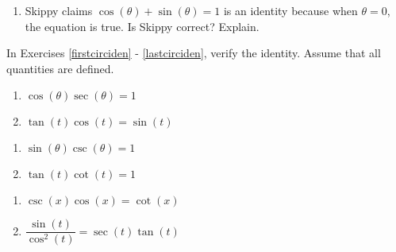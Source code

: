 \begin{enumerate}
\setcounter{enumi}{\value{HW}}

\item Skippy claims  $\cos(\theta) + \sin(\theta) = 1$ is an identity because when $\theta = 0$, the equation is true.  Is Skippy correct? Explain.

\setcounter{HW}{\value{enumi}}
\end{enumerate}

\pagebreak

In Exercises \ref{firstcirciden} - \ref{lastcirciden}, verify the identity.  Assume that all quantities are defined.

\begin{multicols}{2}

\begin{enumerate}

\setcounter{enumi}{\value{HW}}

\item $\cos(\theta) \sec(\theta) = 1$ \label{firstcirciden}
\item $\tan(t)\cos(t) = \sin(t)$

\setcounter{HW}{\value{enumi}}

\end{enumerate}

\end{multicols}

\begin{multicols}{2}

\begin{enumerate}

\setcounter{enumi}{\value{HW}}

\item $\sin(\theta) \csc(\theta) = 1$
\item $\tan(t) \cot(t) = 1$

\setcounter{HW}{\value{enumi}}

\end{enumerate}

\end{multicols}

\begin{multicols}{2}

\begin{enumerate}

\setcounter{enumi}{\value{HW}}

\item $\csc(x) \cos(x) = \cot(x)$ 
\item $\dfrac{\sin(t)}{\cos^{2}(t)} = \sec(t) \tan(t)$

\setcounter{HW}{\value{enumi}}

\end{enumerate}

\end{multicols}

